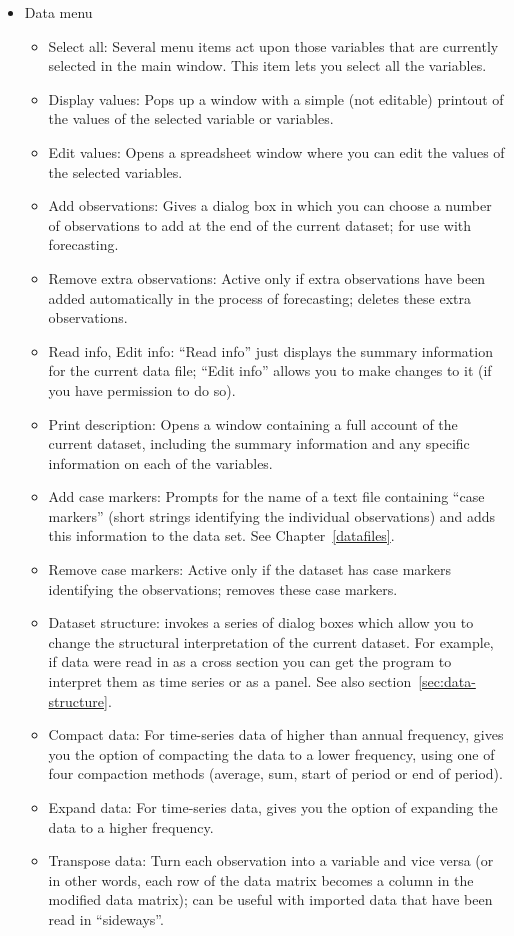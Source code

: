 \begin{itemize}
\item \textsf{Data menu}
  \begin{itemize}
  \item \textsf{Select all}: Several menu items act upon those
    variables that are currently selected in the main window.  This
    item lets you select all the variables.
  \item \textsf{Display values}: Pops up a window with a simple (not
    editable) printout of the values of the selected variable or
    variables.
  \item \textsf{Edit values}: Opens a spreadsheet window where you
    can edit the values of the selected variables. 
  \item \textsf{Add observations}: Gives a dialog box in which you can
    choose a number of observations to add at the end of the current
    dataset; for use with forecasting.
  \item \textsf{Remove extra observations}: Active only if extra
    observations have been added automatically in the process of
    forecasting; deletes these extra observations.
  \item \textsf{Read info}, \textsf{Edit info}: ``Read info'' just
    displays the summary information for the current data file; ``Edit
    info'' allows you to make changes to it (if you have permission to
    do so).
  \item \textsf{Print description}: Opens a window containing a full
    account of the current dataset, including the summary information
    and any specific information on each of the variables.
  \item \textsf{Add case markers}: Prompts for the name of a text file
    containing ``case markers'' (short strings identifying the
    individual observations) and adds this information to the data
    set. See Chapter~\ref{datafiles}.
  \item \textsf{Remove case markers}: Active only if the dataset has
    case markers identifying the observations; removes these case
    markers.
  \item \textsf{Dataset structure}: invokes a series of dialog boxes
    which allow you to change the structural interpretation of the
    current dataset.  For example, if data were read in as a cross
    section you can get the program to interpret them as time series
    or as a panel.  See also section~\ref{sec:data-structure}.
  \item \textsf{Compact data}: For time-series data of higher than
    annual frequency, gives you the option of compacting the data to a
    lower frequency, using one of four compaction methods (average,
    sum, start of period or end of period).
  \item \textsf{Expand data}: For time-series data, gives you the
    option of expanding the data to a higher frequency.
  \item \textsf{Transpose data}: Turn each observation into a variable
    and vice versa (or in other words, each row of the data matrix
    becomes a column in the modified data matrix); can be useful with
    imported data that have been read in ``sideways''.
  \end{itemize}


\end{itemize}
